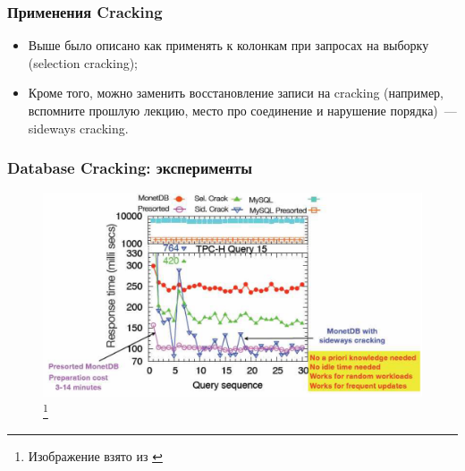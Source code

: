 \documentclass{beamer}
\begin{document}
\begin{frame}
\frametitle{Применения Cracking}

\begin{itemize}
  \setlength\itemsep{1em}
  \item Выше было описано как применять к колонкам при запросах на выборку (selection cracking);
  \item Кроме того, можно заменить восстановление записи на cracking (например, вспомните прошлую лекцию, место про соединение и нарушение порядка)~--- sideways cracking.
\end{itemize}
\end{frame}

\begin{frame}
\frametitle{Database Cracking: эксперименты}

\begin{figure}[htb]
\includegraphics[width=\textwidth,height=0.750\textheight,keepaspectratio]{cracking-experiment.png} 
\footnote{\tiny{Изображение взято из \cite{Harizopoulos2009}}}
\end{figure}

\end{frame}
\end{document}
